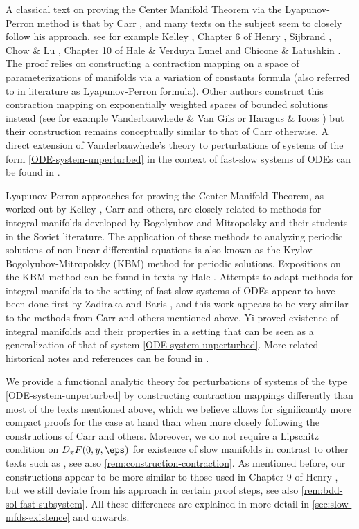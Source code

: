 \documentclass[a4paper]{siamart190516}
\begin{document}
 A classical text on proving the Center Manifold Theorem via the Lyapunov-Perron
 method is that by Carr \cite{Ca81}, and many texts on the subject seem to closely
 follow his approach, see for example Kelley \cite{Ke67}, Chapter 6 of Henry
 \cite{He81}, Sijbrand \cite{Sij85}, Chow \& Lu \cite{ChLu88a, ChLu88b}, Chapter 10
 of Hale \& Verduyn Lunel \cite{HaVL93} and Chicone \& Latushkin \cite{ChLa97}. The
 proof relies on constructing a contraction mapping on a space of
 parameterizations of manifolds via a variation of constants formula (also referred to in literature as Lyapunov-Perron formula). 
 Other authors construct this contraction mapping on exponentially weighted spaces of bounded solutions
  instead (see for example Vanderbauwhede \& Van Gils \cite{VaVG87} or Haragus \& Iooss \cite{HaIo10}) but
 their construction remains conceptually similar to that of Carr otherwise. A direct
 extension of Vanderbauwhede's theory to perturbations of systems of the form
 \cref{ODE-system-unperturbed} in the context of fast-slow systems of ODEs can be
 found in \cite{Sa90}.
 
Lyapunov-Perron approaches for proving the Center Manifold Theorem, as worked out by Kelley
 \cite{Ke67}, Carr \cite{Ca81} and others, are closely related to methods for
 integral manifolds developed by Bogolyubov and Mitropolsky and their students in the
 Soviet literature. The application of these methods to analyzing periodic solutions of non-linear
 differential equations is also known as the Krylov-Bogolyubov-Mitropolsky (KBM)
 method for periodic solutions. Expositions on the KBM-method can be found in texts
 by Hale \cite{Ha61,Ha80}. Attempts to adapt methods for integral manifolds to the
 setting of fast-slow systems of ODEs appear to have been done first by Zadiraka
 \cite{Za65} and Baris \cite{Ba68}, and this work appears to be very similar to the
 methods from Carr \cite{Ca81} and others mentioned above. Yi \cite{Yi93a, Yi93b}
 proved existence of integral manifolds and their properties in a setting that can be
 seen as a generalization of that of system \cref{ODE-system-unperturbed}. More
 related historical notes and references can be found in \cite{KnAu84, Ly92,
 ScSoMo14}. 
 
We provide a functional analytic theory for perturbations of systems of the type
\cref{ODE-system-unperturbed} by constructing contraction mappings differently than
most of the texts mentioned above, which we believe allows for significantly more
compact proofs for the case at hand than when more closely following the
constructions of Carr \cite{Ca81} and others. Moreover, we do not require a Lipschitz
condition on $D_x F(0,y,\eps)$ for existence of slow manifolds in contrast to other
texts such as \cite{Sa90, Yi93a}, see also \cref{rem:construction-contraction}.
As mentioned before, our constructions appear to be more similar to those used in Chapter 9 of Henry
\cite{He81}, but we still deviate from his approach in certain proof steps, see also 
\cref{rem:bdd-sol-fast-subsystem}. All these differences are explained in more detail
in \cref{sec:slow-mfds-existence} and onwards. 
\end{document}
